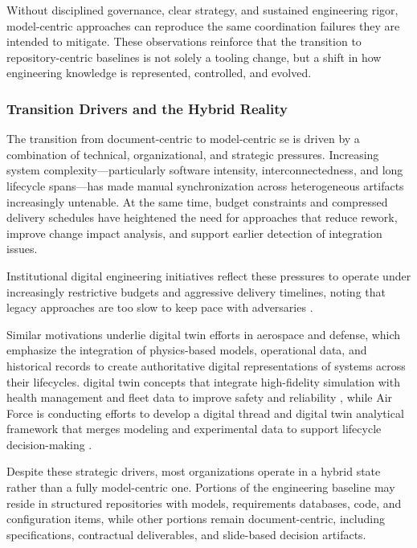Without disciplined governance, clear strategy, and sustained engineering rigor, model-centric approaches can reproduce the same coordination failures they are intended to mitigate. These observations reinforce that the transition to repository-centric baselines is not solely a tooling change, but a shift in how engineering knowledge is represented, controlled, and evolved.



\subsubsection{Transition Drivers and the Hybrid Reality}
\label{subsubsec:ch2_transition_drivers}

The transition from document-centric to model-centric \ac{se} is driven by a combination of technical, organizational, and strategic pressures. Increasing system complexity—particularly software intensity, interconnectedness, and long lifecycle spans—has made manual synchronization across heterogeneous artifacts increasingly untenable. At the same time, budget constraints and compressed delivery schedules have heightened the need for approaches that reduce rework, improve change impact analysis, and support earlier detection of integration issues.

Institutional digital engineering initiatives reflect these pressures to operate under increasingly restrictive budgets and aggressive delivery timelines, noting that legacy approaches are too slow to keep pace with adversaries \cite{NAVWAR_DE_Strategy_2023}.

Similar motivations underlie digital twin efforts in aerospace and defense, which emphasize the integration of physics-based models, operational data, and historical records to create authoritative digital representations of systems across their lifecycles. digital twin concepts that integrate high-fidelity simulation with health management and fleet data to improve safety and reliability \cite{glaessgen_DigitalTwinParadigmFuture_2012}, while Air Force is conducting efforts to develop a digital thread and digital twin analytical framework that merges modeling and experimental data to support lifecycle decision-making \cite{kraft_AirForceDigital_2016}.

Despite these strategic drivers, most organizations operate in a hybrid state rather than a fully model-centric one. Portions of the engineering baseline may reside in structured repositories with models, requirements databases, code, and configuration items, while other portions remain document-centric, including specifications, contractual deliverables, and slide-based decision artifacts.

